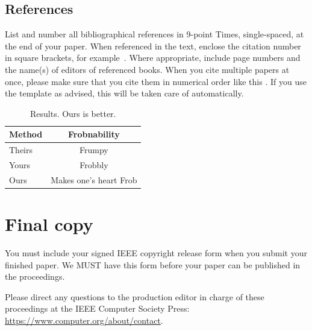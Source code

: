 \documentclass[10pt,twocolumn,letterpaper]{article}
\begin{document}
\subsection{References}

List and number all bibliographical references in 9-point Times, single-spaced, at the end of your paper.
When referenced in the text, enclose the citation number in square brackets, for
example~\cite{Authors14}.
Where appropriate, include page numbers and the name(s) of editors of referenced books.
When you cite multiple papers at once, please make sure that you cite them in numerical order like this \cite{Alpher02,Alpher03,Alpher05,Authors14b,Authors14}.
If you use the template as advised, this will be taken care of automatically.

\begin{table}
  \centering
  \begin{tabular}{@{}lc@{}}
    \toprule
    Method & Frobnability \\
    \midrule
    Theirs & Frumpy \\
    Yours & Frobbly \\
    Ours & Makes one's heart Frob\\
    \bottomrule
  \end{tabular}
  \caption{Results.   Ours is better.}
  \label{tab:example}
\end{table}

\section{Final copy}

You must include your signed IEEE copyright release form when you submit your finished paper.
We MUST have this form before your paper can be published in the proceedings.

Please direct any questions to the production editor in charge of these proceedings at the IEEE Computer Society Press:
\url{https://www.computer.org/about/contact}.
\end{document}
